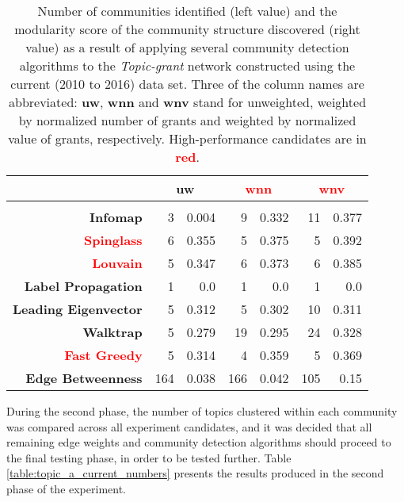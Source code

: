 \begin{table}[!htbp]
\centering
\caption[Number of communities and modularity score of the community structure identified in the \textit{Topic-grant} network constructed using the current (2010 to 2016) data set]{Number of communities identified (left value) and the modularity score of the community structure discovered (right value) as a result of applying several community detection algorithms to the \textit{Topic-grant} network constructed using the current (2010 to 2016) data set. Three of the column names are abbreviated: \textbf{uw}, \textbf{wnn} and \textbf{wnv} stand for unweighted, weighted by normalized number of grants and weighted by normalized value of grants, respectively. High-performance candidates are in \textbf{\textcolor{red}{red}}.}
\label{table:topic_a_current_modularity}
\begin{tabular}{r|rrrrrr}
\textbf{} & \multicolumn{2}{c}{\textbf{uw}} & \multicolumn{2}{c}{\textcolor{red}{\textbf{wnn}}} & \multicolumn{2}{c}{\textcolor{red}{\textbf{wnv}}}\\
\hline\\
\textbf{Infomap}             & {3}   & {0.004} & {9}   & {0.332} & {11}  & {0.377}\\
\textcolor{red}{\textbf{Spinglass}} & {6} & {0.355} & {5} & {0.375} & {5} & {0.392}\\
\textcolor{red}{\textbf{Louvain}} & {5} & {0.347} & {6} & {0.373} & {6} & {0.385}\\
\textbf{Label Propagation}   & {1}   & {0.0}   & {1}   & {0.0}   & {1}   & {0.0}\\
\textbf{Leading Eigenvector} & {5}   & {0.312} & {5}   & {0.302} & {10}  & {0.311}\\
\textbf{Walktrap}            & {5}   & {0.279} & {19}  & {0.295} & {24}  & {0.328}\\
\textcolor{red}{\textbf{Fast Greedy}} & {5} & {0.314} & {4} & {0.359} & {5}   & {0.369}\\
\textbf{Edge Betweenness}    & {164} & {0.038} & {166} & {0.042} & {105} & {0.15}
\end{tabular}
\end{table}

During the second phase, the number of topics clustered within each community was compared across all experiment candidates, and it was decided that all remaining edge weights and community detection algorithms should proceed to the final testing phase, in order to be tested further. Table \ref{table:topic_a_current_numbers} presents the results produced in the second phase of the experiment.

